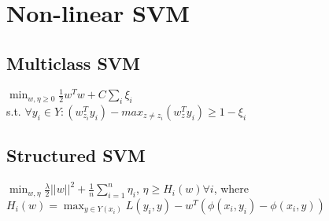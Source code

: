 \section{Non-linear SVM}
\subsection*{Multiclass SVM}
$\min_{w, \eta\geq 0} \frac{1}{2} w^T w + C \sum_i \xi_i$\\
s.t. $\forall y_i \in Y:( w_{z_i}^T y_i) - max_{z \not = z_i} (w_z^T y_i) \geq 1-\xi_i$
\subsection*{Structured SVM}
$\min_{w, \eta} \frac{\lambda}{2} ||w||^2 + \frac{1}{n} \sum_{i=1}^n \eta_i$, $\eta \geq H_i(w) \forall i$, where\\
$H_i(w)=\max_{y \in Y(x_i)} L(y_i, y) - w^T(\phi(x_i,y_i) - \phi(x_i,y))$